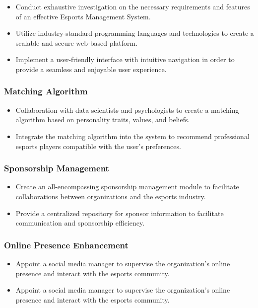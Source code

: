 \begin{itemize}
    \item Conduct exhaustive investigation on the necessary requirements and features of an effective Esports Management System.
    \item  Utilize industry-standard programming languages and technologies to create a scalable and secure web-based platform.
    \item Implement a user-friendly interface with intuitive navigation in order to provide a seamless and enjoyable user experience.
\end{itemize}

\subsubsection*{ Matching Algorithm}
\begin{itemize}
    \item Collaboration with data scientists and psychologists to create a matching algorithm based on personality traits, values, and beliefs.
    \item Integrate the matching algorithm into the system to recommend professional esports players compatible with the user's preferences.
\end{itemize}

\subsubsection*{Sponsorship Management}
\begin{itemize}
    \item Create an all-encompassing sponsorship management module to facilitate collaborations between organizations and the esports industry.
    \item  Provide a centralized repository for sponsor information to facilitate communication and sponsorship efficiency.
\end{itemize}

\subsubsection*{Online Presence Enhancement}
\begin{itemize}
    \item Appoint a social media manager to supervise the organization's online presence and interact with the esports community.
    \item Appoint a social media manager to supervise the organization's online presence and interact with the esports community.
\end{itemize}


